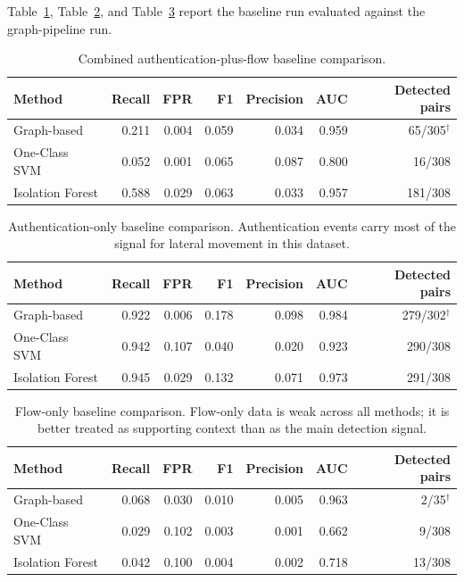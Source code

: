 Table~\ref{tab:baseline_combined}, Table~\ref{tab:baseline_auth}, and Table~\ref{tab:baseline_flow} report the baseline run evaluated against the graph-pipeline run.

\begin{table}[h]
\centering
\small
\begin{tabular}{lrrrrrr}
\hline
Method & Recall & FPR & F1 & Precision & AUC & Detected pairs \\
\hline
Graph-based      & 0.211 & 0.004 & 0.059 & 0.034 & 0.959 & 65/305$^\dagger$ \\
One-Class SVM    & 0.052 & 0.001 & 0.065 & 0.087 & 0.800 & 16/308 \\
Isolation Forest & 0.588 & 0.029 & 0.063 & 0.033 & 0.957 & 181/308 \\
\hline
\end{tabular}
\caption{Combined authentication-plus-flow baseline comparison.}
\label{tab:baseline_combined}
\end{table}

\begin{table}[h]
\centering
\small
\begin{tabular}{lrrrrrr}
\hline
Method & Recall & FPR & F1 & Precision & AUC & Detected pairs \\
\hline
Graph-based      & 0.922 & 0.006 & 0.178 & 0.098 & 0.984 & 279/302$^\dagger$ \\
One-Class SVM    & 0.942 & 0.107 & 0.040 & 0.020 & 0.923 & 290/308 \\
Isolation Forest & 0.945 & 0.029 & 0.132 & 0.071 & 0.973 & 291/308 \\
\hline
\end{tabular}
\caption{Authentication-only baseline comparison. Authentication events carry most of the signal for lateral movement in this dataset.}
\label{tab:baseline_auth}
\end{table}

\begin{table}[h]
\centering
\small
\begin{tabular}{lrrrrrr}
\hline
Method & Recall & FPR & F1 & Precision & AUC & Detected pairs \\
\hline
Graph-based      & 0.068 & 0.030 & 0.010 & 0.005 & 0.963 & 2/35$^\dagger$ \\
One-Class SVM    & 0.029 & 0.102 & 0.003 & 0.001 & 0.662 & 9/308 \\
Isolation Forest & 0.042 & 0.100 & 0.004 & 0.002 & 0.718 & 13/308 \\
\hline
\end{tabular}
\caption{Flow-only baseline comparison. Flow-only data is weak across all methods; it is better treated as supporting context than as the main detection signal.}
\label{tab:baseline_flow}
\end{table}

